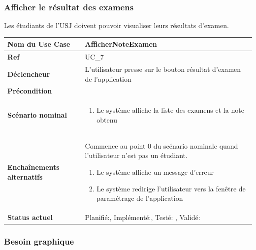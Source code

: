 								

			\subsubsection{Afficher le résultat des examens}
								Les étudiants de l'USJ doivent pouvoir visualiser leurs résultats d'examen.\\[0.2cm]
								\begin{longtable}{|l|p{10cm}|}
									\hline \textbf{Nom du Use Case} & AfficherNoteExamen \\ 
									\hline \textbf{Ref} & UC\_7  \\ 
									\hline \textbf{Déclencheur} & L'utilisateur presse sur le bouton résultat d'examen  de l'application \\
									\hline \textbf{Précondition} &  \\
									\hline \textbf{Scénario nominal} & 
									\begin{enumerate}
										\item Le système affiche la liste des examens et la note obtenu 
									\end{enumerate}
									\\ 
									\hline \textbf{Enchaînements alternatifs} & 
										Commence au point 0 du scénario  nominale quand l'utilisateur  n'est pas un étudiant.
									\begin{enumerate}
										\item Le système affiche un message d'erreur
										\item Le système redirige l'utilisateur vers la fenêtre de paramétrage de l'application
									\end{enumerate}\\
									\hline \textbf{Status actuel} & Planifié:\CheckedBox , Implémenté:\CheckedBox  , Testé: \CheckedBox  , Validé: \CheckedBox	  \\
									\hline 
								\end{longtable} 
						\subsubsection*{Besoin graphique}
			
